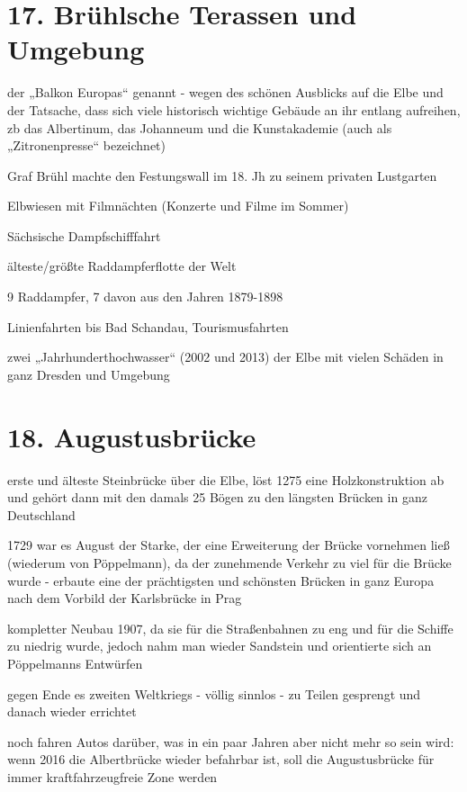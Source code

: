 \documentclass[a4paper,12pt]{report}
\begin{document}
\section{17. Brühlsche Terassen und Umgebung}
\begin{itemize*}
\item der „Balkon Europas“ genannt - wegen des schönen Ausblicks auf die Elbe und der Tatsache, dass sich viele historisch wichtige Gebäude an ihr entlang aufreihen, zb das Albertinum, das Johanneum und die Kunstakademie (auch als „Zitronenpresse“ bezeichnet)
\item Graf Brühl machte den Festungswall im 18. Jh zu seinem privaten Lustgarten
\item Elbwiesen mit Filmnächten (Konzerte und Filme im Sommer)
\item Sächsische Dampfschifffahrt
    \begin{itemize*}
    \item älteste/größte Raddampferflotte der Welt
    \item 9 Raddampfer, 7 davon aus den Jahren 1879-1898
    \item Linienfahrten bis Bad Schandau, Tourismusfahrten
    \end{itemize*}
\item zwei „Jahrhunderthochwasser“ (2002 und 2013) der Elbe mit vielen Schäden in ganz Dresden und Umgebung
\end{itemize*}

\section{18. Augustusbrücke}
\begin{itemize*}
\item erste und älteste Steinbrücke über die Elbe, löst 1275 eine Holzkonstruktion ab und gehört dann mit den damals 25 Bögen zu den längsten Brücken in ganz Deutschland
\item 1729 war es August der Starke, der eine Erweiterung der Brücke vornehmen ließ (wiederum von Pöppelmann), da der zunehmende Verkehr zu viel für die Brücke wurde - erbaute eine der prächtigsten und schönsten Brücken in ganz Europa nach dem Vorbild der Karlsbrücke in Prag
\item kompletter Neubau 1907, da sie für die Straßenbahnen zu eng und für die Schiffe zu niedrig wurde, jedoch nahm man wieder Sandstein und orientierte sich an Pöppelmanns Entwürfen
\item gegen Ende es zweiten Weltkriegs - völlig sinnlos - zu Teilen gesprengt und danach wieder errichtet
\item noch fahren Autos darüber, was in ein paar Jahren aber nicht mehr so sein wird: wenn 2016 die Albertbrücke wieder befahrbar ist, soll die Augustusbrücke für immer kraftfahrzeugfreie Zone werden
\end{itemize*}
\end{document}
